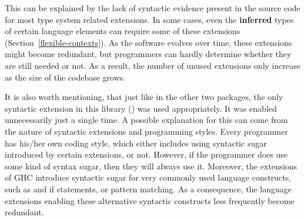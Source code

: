\documentclass[main.tex]{subfiles}
\begin{document}
	This can be explained by the lack of syntactic evidence present in the source code for most type system related extensions. In some cases, even the \textbf{inferred} types of certain language elements can require some of these extensions (Section~\ref{flexible-contexts}). As the software evolves over time, these extensions might become redundant, but programmers can hardly determine whether they are still needed or not. As a result, the number of unused extensions only increase as the size of the codebase grows.
	
	It is also worth mentioning, that just like in the other two packages, the only syntactic extension in this library () was used appropriately. It was enabled unnecessarily just a single time. A possible explanation for this can come from the nature of syntactic extensions and programming styles. Every programmer has his/her own coding style, which either includes using syntactic sugar introduced by certain extensions, or not. However, if the programmer does use some kind of syntax sugar, then they will always use it. Moreover, the extensions of GHC introduce syntactic sugar for very commonly used language constructs, such as  and if  statements, or pattern matching. As a consequence, the language extensions enabling these alternative syntactic constructs less frequently become redundant.

		
\end{document}
